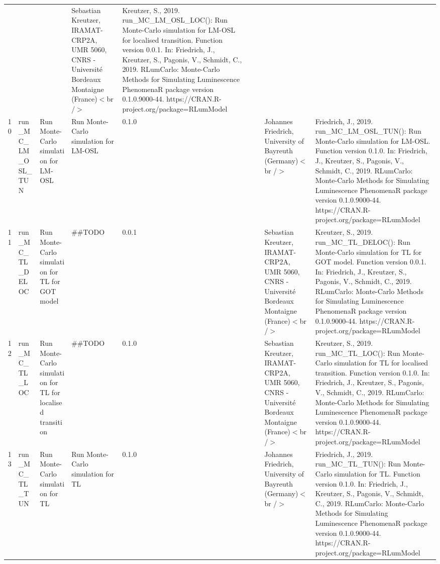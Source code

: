 \begin{table}[ht]
\begin{tabular}{rllllllll}
 &  &  & Sebastian Kreutzer, IRAMAT-CRP2A, UMR 5060, CNRS - Université Bordeaux Montaigne (France)$<$br /$>$ & Kreutzer, S., 2019. run\_MC\_LM\_OSL\_LOC(): Run Monte-Carlo simulation for LM-OSL for localised transition. Function version 0.0.1. In: Friedrich, J., Kreutzer, S., Pagonis, V., Schmidt, C., 2019. RLumCarlo: Monte-Carlo Methods for Simulating Luminescence PhenomenaR package version 0.1.0.9000-44. https://CRAN.R-project.org/package=RLumModel
 \\ 
  10 & run\_MC\_LM\_OSL\_TUN & Run Monte-Carlo simulation for LM-OSL & Run Monte-Carlo simulation for LM-OSL & 0.1.0
 &  &  & Johannes Friedrich, University of Bayreuth (Germany)$<$br /$>$ & Friedrich, J., 2019. run\_MC\_LM\_OSL\_TUN(): Run Monte-Carlo simulation for LM-OSL. Function version 0.1.0. In: Friedrich, J., Kreutzer, S., Pagonis, V., Schmidt, C., 2019. RLumCarlo: Monte-Carlo Methods for Simulating Luminescence PhenomenaR package version 0.1.0.9000-44. https://CRAN.R-project.org/package=RLumModel
 \\ 
  11 & run\_MC\_TL\_DELOC & Run Monte-Carlo simulation for TL for GOT model & \#\#TODO & 0.0.1
 &  &  & Sebastian Kreutzer, IRAMAT-CRP2A, UMR 5060, CNRS - Université Bordeaux Montaigne (France)$<$br /$>$ & Kreutzer, S., 2019. run\_MC\_TL\_DELOC(): Run Monte-Carlo simulation for TL for GOT model. Function version 0.0.1. In: Friedrich, J., Kreutzer, S., Pagonis, V., Schmidt, C., 2019. RLumCarlo: Monte-Carlo Methods for Simulating Luminescence PhenomenaR package version 0.1.0.9000-44. https://CRAN.R-project.org/package=RLumModel
 \\ 
  12 & run\_MC\_TL\_LOC & Run Monte-Carlo simulation for TL for localised transition & \#\#TODO & 0.1.0
 &  &  & Sebastian Kreutzer, IRAMAT-CRP2A, UMR 5060, CNRS - Université Bordeaux Montaigne (France)$<$br /$>$ & Kreutzer, S., 2019. run\_MC\_TL\_LOC(): Run Monte-Carlo simulation for TL for localised transition. Function version 0.1.0. In: Friedrich, J., Kreutzer, S., Pagonis, V., Schmidt, C., 2019. RLumCarlo: Monte-Carlo Methods for Simulating Luminescence PhenomenaR package version 0.1.0.9000-44. https://CRAN.R-project.org/package=RLumModel
 \\ 
  13 & run\_MC\_TL\_TUN & Run Monte-Carlo simulation for TL & Run Monte-Carlo simulation for TL & 0.1.0
 &  &  & Johannes Friedrich, University of Bayreuth (Germany)$<$br /$>$ & Friedrich, J., 2019. run\_MC\_TL\_TUN(): Run Monte-Carlo simulation for TL. Function version 0.1.0. In: Friedrich, J., Kreutzer, S., Pagonis, V., Schmidt, C., 2019. RLumCarlo: Monte-Carlo Methods for Simulating Luminescence PhenomenaR package version 0.1.0.9000-44. https://CRAN.R-project.org/package=RLumModel

\end{tabular}
\end{table}
